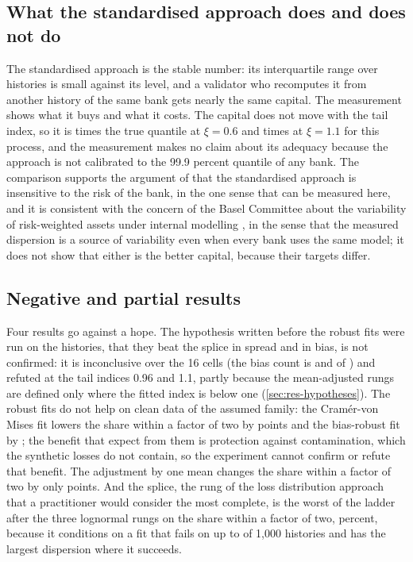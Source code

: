 \subsection{What the standardised approach does and does not do}
\label{sec:disc-sma}

The standardised approach is the stable number: its interquartile range over histories is small against its level, and a validator who recomputes it from another history of the same bank gets nearly the same capital. The measurement shows what it buys and what it costs. The capital does not move with the tail index, so it is \smaA{} times the true quantile at $\xi=0.6$ and \smaD{} times at $\xi=1.1$ for this process, and the measurement makes no claim about its adequacy because the approach is not calibrated to the 99.9 percent quantile of any bank.
The comparison supports the argument of \citet{peters2016} that the standardised approach is insensitive to the risk of the bank, in the one sense that can be measured here, and it is consistent with the concern of the Basel Committee about the variability of risk-weighted assets under internal modelling \citep{bcbsd355}, in the sense that the measured dispersion is a source of variability even when every bank uses the same model; it does not show that either is the better capital, because their targets differ.

\subsection{Negative and partial results}
\label{sec:disc-negative}

Four results go against a hope. The hypothesis written before the robust fits were run on the histories, that they beat the splice in spread and in bias, is not confirmed: it is inconclusive over the 16 cells (the bias count is \rhCvmBias{} and \rhObreBias{} of \rhCells{}) and refuted at the tail indices 0.96 and 1.1, partly because the mean-adjusted rungs are defined only where the fitted index is below one (\cref{sec:res-hypotheses}). The robust fits do not help on clean data of the assumed family: the Cram\'er-von Mises fit lowers the share within a factor of two by \abCvmDown{} points and the bias-robust fit by \abObreDown{}; the benefit that \citet{opdyke2012} expect from them is protection against contamination, which the synthetic losses do not contain, so the experiment cannot confirm or refute that benefit. The adjustment by one mean changes the share within a factor of two by only \abMeanadjustedDelta{} points.
And the splice, the rung of the loss distribution approach that a practitioner would consider the most complete, is the worst of the ladder after the three lognormal rungs on the share within a factor of two, \plSpWithin{} percent, because it conditions on a fit that fails on up to \spUndMax{} of 1{,}000 histories and has the largest dispersion where it succeeds.

